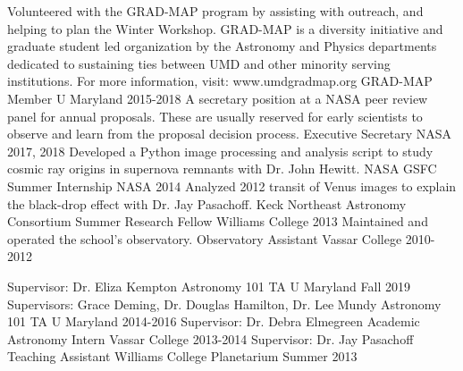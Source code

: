 \documentclass[]{awesome-cv}
\begin{document}
\begin{cventries}
	\cventry
	{Volunteered with the GRAD-MAP program by assisting with outreach, and helping to plan the Winter Workshop. GRAD-MAP is a diversity initiative and graduate student led organization by the Astronomy and Physics departments dedicated to sustaining ties between UMD and other minority serving institutions. For more information, visit: www.umdgradmap.org}
	{GRAD-MAP Member}
	{U Maryland}
	{2015-2018}
	{}
	\cventry
	{A secretary position at a NASA peer review panel for annual proposals. These are usually reserved for early scientists to observe and learn from the proposal decision process.}
	{Executive Secretary}
	{NASA}
	{2017, 2018}
	{}
	\cventry
	{Developed a Python image processing and analysis script to study cosmic ray origins in supernova remnants with Dr. John Hewitt.}
	{NASA GSFC Summer Internship}
	{NASA}
	{2014}
	{}
	\cventry
	{Analyzed 2012 transit of Venus images to explain the black-drop effect with Dr. Jay Pasachoff.}
	{Keck Northeast Astronomy Consortium Summer Research Fellow }
	{Williams College}
	{2013}
	{}
	\cventry
	{Maintained and operated the school's observatory.}
	{Observatory Assistant}
	{Vassar College}
	{2010-2012}
	{}
	
	\vspace{-7mm}
\end{cventries}

\begin{cventries}
	\cventry
	{Supervisor: Dr. Eliza Kempton}
	{Astronomy 101 TA}
	{U Maryland}
	{Fall 2019}
	{}
	\cventry
	{Supervisors: Grace Deming, Dr. Douglas Hamilton, Dr. Lee Mundy}
	{Astronomy 101 TA}
	{U Maryland}
	{2014-2016}
	{}
	\cventry
	{Supervisor: Dr. Debra Elmegreen}
	{Academic Astronomy Intern}
	{Vassar College}
	{2013-2014}
	{}
	\cventry
	{Supervisor: Dr. Jay Pasachoff}
	{Teaching Assistant}
	{Williams College Planetarium}
	{Summer 2013}
	{}
\end{cventries}
\end{document}
